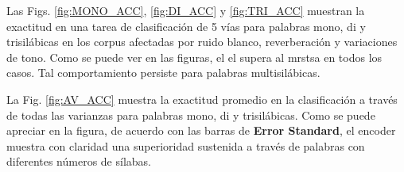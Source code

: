 
Las Figs. \ref{fig:MONO_ACC}, \ref{fig:DI_ACC} y \ref{fig:TRI_ACC} muestran la exactitud en una tarea de clasificación de 5 vías para palabras mono, di y trisilábicas en los corpus afectadas por ruido blanco, reverberación y variaciones de tono. Como se puede ver en las figuras, el \gls{el} supera al \gls{mrstsa} en todos los casos. Tal comportamiento persiste para palabras multisilábicas.


La Fig. \ref{fig:AV_ACC} muestra la exactitud promedio en la clasificación a través de todas las varianzas para palabras mono, di y trisilábicas. Como se puede apreciar en la figura, de acuerdo con las barras de \textbf{Error Standard}, el encoder muestra con claridad una superioridad sustenida a través de palabras con diferentes números de sílabas.


